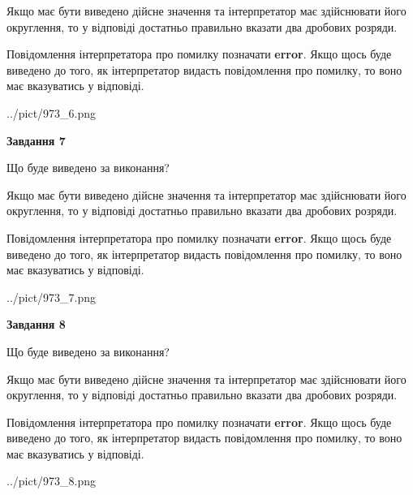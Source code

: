 \documentclass[12pt, ukrainian]{article}
\begin{document}
{\begin {Large}
Якщо має бути виведено дійсне значення та інтерпретатор має здійснювати його округлення, 
то у відповіді достатньо правильно вказати два дробових розряди.

Повідомлення інтерпретатора про помилку позначати \textbf{error}.
Якщо щось буде виведено до того, як інтерпретатор видасть повідомлення про помилку, 
то воно має вказуватись у відповіді. \par

\begin{center}
	{../pict/973_6.png}
\end{center}
\newpage

{\begin {center}\textbf{Завдання 7}\end {center}}\par
Що буде виведено за виконання? \par

Якщо має бути виведено дійсне значення та інтерпретатор має здійснювати його округлення, 
то у відповіді достатньо правильно вказати два дробових розряди.

Повідомлення інтерпретатора про помилку позначати \textbf{error}.
Якщо щось буде виведено до того, як інтерпретатор видасть повідомлення про помилку, 
то воно має вказуватись у відповіді. \par

\begin{center}
	{../pict/973_7.png}
\end{center}
\newpage

{\begin {center}\textbf{Завдання 8}\end {center}}\par
Що буде виведено за виконання? \par

Якщо має бути виведено дійсне значення та інтерпретатор має здійснювати його округлення, 
то у відповіді достатньо правильно вказати два дробових розряди.

Повідомлення інтерпретатора про помилку позначати \textbf{error}.
Якщо щось буде виведено до того, як інтерпретатор видасть повідомлення про помилку, 
то воно має вказуватись у відповіді. \par

\begin{center}
	{../pict/973_8.png}
\end{center}
\newpage


\end{Large}}
\end{document}
